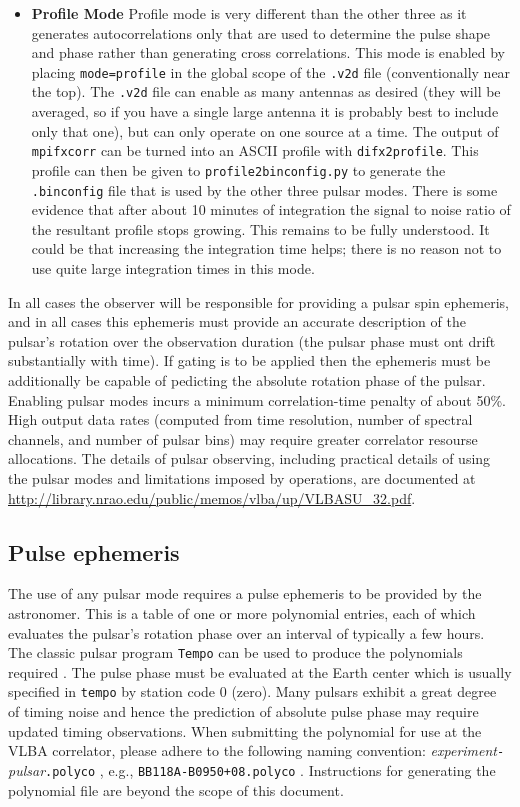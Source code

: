 \begin{itemize}
\item \label{psrmode:profile} {\bf Profile Mode}
Profile mode is very different than the other three as it generates autocorrelations only that are used to determine the pulse shape and phase rather than generating cross correlations.
This mode is enabled by placing {\tt mode=profile} in the global scope of the {\tt .v2d} file (conventionally near the top).
The {\tt .v2d} file can enable as many antennas as desired (they will be averaged, so if you have a single large antenna it is probably best to include only that one), but can only operate on one source at a time.
The output of {\tt mpifxcorr} can be turned into an ASCII profile with {\tt difx2profile}.
This profile can then be given to {\tt profile2binconfig.py} to generate the {\tt .binconfig} file that is used by the other three pulsar modes.
There is some evidence that after about 10 minutes of integration the signal to noise ratio of the resultant profile stops growing.
This remains to be fully understood.
It could be that increasing the integration time helps; there is no reason not to use quite large integration times in this mode.

\end{itemize}

In all cases the observer will be responsible for providing a pulsar
spin ephemeris, and in all cases this ephemeris must provide an accurate
description of the pulsar's rotation over the observation duration (the pulsar 
phase must ont drift substantially with time).  If gating is to be applied then 
the ephemeris must be additionally be capable
of pedicting the absolute rotation phase of the pulsar.
Enabling pulsar modes incurs a minimum correlation-time penalty of
about 50\%.  High output data rates (computed from time resolution,
number of spectral channels, and number of pulsar bins) may require 
greater correlator resourse allocations.
The details of pulsar observing, including practical details of using
the pulsar modes and limitations imposed by operations, 
are documented at \url{http://library.nrao.edu/public/memos/vlba/up/VLBASU_32.pdf}.

\subsection{Pulse ephemeris}

The use of any pulsar mode requires a pulse ephemeris to be provided by the astronomer.  
This is a table of one or more polynomial entries, each of which evaluates the pulsar's rotation phase over an interval of typically a few hours.
The classic pulsar program {\tt Tempo} can be used to produce the polynomials required \cite{tempo}.
The pulse phase must be evaluated at the Earth center which is usually specified in {\tt tempo} by station code 0 (zero).
Many pulsars exhibit a great degree of timing noise and hence the prediction of absolute pulse phase may require updated timing observations.
When submitting the polynomial for use at the VLBA correlator, please adhere to the following naming convention: {\em experiment}{\tt -}{\em pulsar}{\tt .polyco} , e.g., {\tt BB118A-B0950+08.polyco} .
Instructions for generating the polynomial file are beyond the scope of this document.

